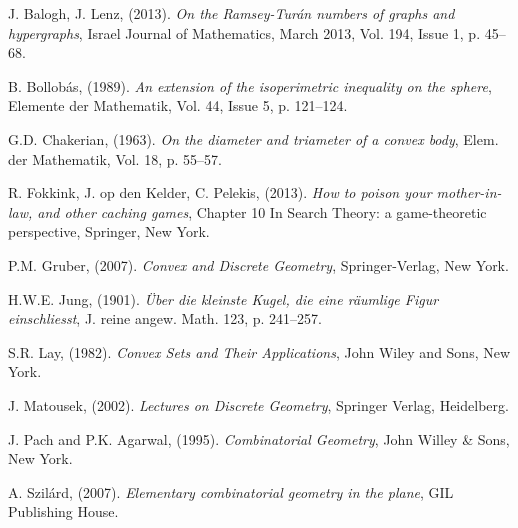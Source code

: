 \documentclass[12pt]{article}
\begin{document}
\begin{thebibliography}{99}

 J. Balogh, J. Lenz, (2013). \textit{On the Ramsey-Tur\'an numbers of graphs and hypergraphs},
Israel Journal of Mathematics,
March 2013, Vol. 194, Issue 1, p. 45--68.

 B. Bollob\'as, (1989). \textit{An extension of the isoperimetric inequality on the sphere}, 
Elemente der Mathematik, Vol. 44, Issue 5, p. 121--124. 

 G.D. Chakerian, (1963). \textit{On the diameter and triameter of a convex body}, 
Elem. der Mathematik, Vol. 18, p. 55--57.



 R. Fokkink, J. op den Kelder, C. Pelekis, (2013). \textit{How to poison your 
mother-in-law, and other caching games}, Chapter 10 In Search Theory: a game-theoretic perspective, 
Springer, New York. 

 P.M. Gruber, (2007). \textit{Convex and Discrete Geometry}, Springer-Verlag, New York.

 H.W.E. Jung, (1901). \textit{\"Uber die kleinste Kugel, die eine r\"aumlige Figur einschliesst},
J. reine angew. 
Math. 123, p. 241--257.

 S.R. Lay, (1982). \textit{Convex Sets and Their Applications}, John Wiley and Sons, New York.

 J. Matousek, (2002). \textit{Lectures on Discrete Geometry}, Springer Verlag, Heidelberg.



 J. Pach and P.K. Agarwal, (1995). \textit{Combinatorial Geometry}, John Willey \& Sons, New York.

 A. Szil\'ard, (2007). \textit{Elementary combinatorial geometry in the plane}, GIL Publishing House.

\end{thebibliography}
\end{document}
